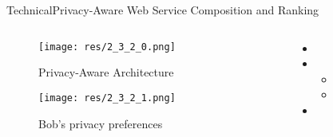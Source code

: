 \begin{frame}{Technical}{Privacy-Aware Web Service Composition and Ranking \cite{costante_privacyaware_2013}}

	\begin{columns}
		\begin{column}{0.5\textwidth}
			\begin{center}
			
				\begin{figure}
					\texttt{[image: res/2\_3\_2\_0.png]}
					\caption{\label{fig:2_1_5_0} Privacy-Aware Architecture}
				\end{figure}
				
				\begin{figure}
					\texttt{[image: res/2\_3\_2\_1.png]}
					\caption{\label{fig:2_1_5_1} Bob’s privacy preferences}
				\end{figure}
				
			\end{center}
		\end{column}
		
		\begin{column}{0.5\textwidth}
		
			\begin{itemize}
				\item 
				
				\item 
					\begin{itemize}
						\item 
						\item 
					\end{itemize}
				
				\item 
			\end{itemize}
			
		\end{column}
	\end{columns}
	

\end{frame}

